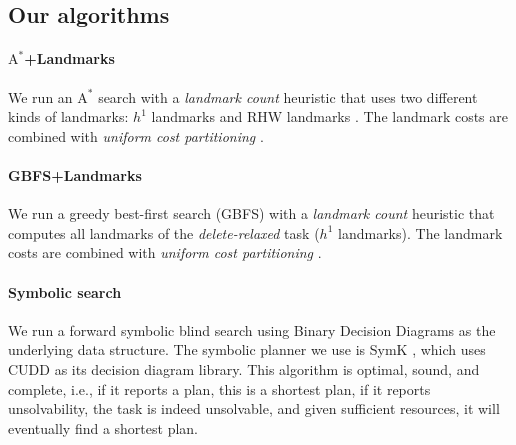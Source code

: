 \documentclass{article}
\newcommand{\astar}{\ensuremath{\text{A}^*}}
\renewcommand{\cite}[1]{\citep{#1}}
\begin{document}
\subsection{Our algorithms}

\paragraph{$\astar$+Landmarks} We run an $\astar$ search
\cite{hart-et-al-ieeessc1968} with a \emph{landmark count} heuristic
\cite{karpas-domshlak-ijcai2009} that uses two different kinds of landmarks:
$h^1$ landmarks \cite{keyder-et-al-ecai2010} and RHW landmarks
\cite{richter-et-al-aaai2008}. The landmark costs are combined with
\emph{uniform cost partitioning} \cite{katz-domshlak-icaps2008b}.

\paragraph{GBFS+Landmarks} We run a greedy best-first search (GBFS)
\cite{doran-michie-rsl1966} with a \emph{landmark count} heuristic
\cite{keyder-et-al-ecai2010} that computes all landmarks of the
\emph{delete-relaxed} task \cite{bonet-geffner-aij2001} ($h^1$ landmarks). The
landmark costs are combined with \emph{uniform cost partitioning}
\cite{katz-domshlak-icaps2008b}.

\paragraph{Symbolic search}
We run a forward symbolic blind search 
\cite{torralba-et-al-aij2017,speck-et-al-icaps2020} using Binary Decision 
Diagrams \cite{bryant-ieeecomp1986} as the underlying data structure. 
The symbolic planner we use is SymK \cite{speck-et-al-aaai2020}, which uses 
CUDD \cite{somenzi-cudd2015} as its decision diagram library. 
This algorithm is optimal, sound, and complete, i.e., if it reports a plan, 
this is a shortest plan, if it reports unsolvability, the task is indeed 
unsolvable, and given sufficient resources, it will eventually find a shortest 
plan.
\end{document}
